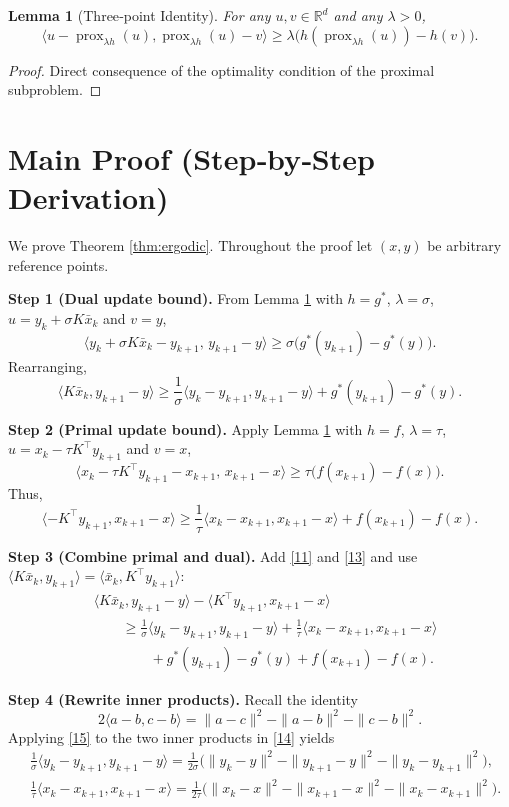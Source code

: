 \documentclass{article}
\newtheorem{lemma}{Lemma}
\newcommand{\prox}{\operatorname{prox}}
\newcommand{\inner}[2]{\langle #1,#2\rangle}
\newcommand{\norm}[1]{\|#1\|}
\begin{document}
\begin{lemma}[Three‑point Identity]\label{lem:three}
For any $u,v\in\mathbb{R}^{d}$ and any $\lambda>0$,
\[
\langle u-\prox_{\lambda h}(u),\prox_{\lambda h}(u)-v\rangle
\ge \lambda\bigl(h(\prox_{\lambda h}(u))-h(v)\bigr).
\tag{9}
\]
\end{lemma}
\begin{proof}
Direct consequence of the optimality condition of the proximal subproblem. \qedhere
\end{proof}

\section*{Main Proof (Step‑by‑Step Derivation)}
We prove Theorem \ref{thm:ergodic}. Throughout the proof let $(x,y)$ be arbitrary reference points.

\medskip
\noindent\textbf{Step 1 (Dual update bound).}  
From Lemma \ref{lem:three} with $h=g^{*}$, $\lambda=\sigma$, $u=y_{k}+\sigma K\bar x_{k}$ and $v=y$,
\[
\langle y_{k}+\sigma K\bar x_{k}-y_{k+1},\,y_{k+1}-y\rangle
\ge \sigma\bigl(g^{*}(y_{k+1})-g^{*}(y)\bigr).
\tag{10}
\]
Rearranging,
\[
\langle K\bar x_{k},y_{k+1}-y\rangle
\ge \frac{1}{\sigma}\langle y_{k}-y_{k+1},y_{k+1}-y\rangle
+g^{*}(y_{k+1})-g^{*}(y).
\tag{11}
\]

\medskip
\noindent\textbf{Step 2 (Primal update bound).}  
Apply Lemma \ref{lem:three} with $h=f$, $\lambda=\tau$, $u=x_{k}-\tau K^{\top}y_{k+1}$ and $v=x$,
\[
\langle x_{k}-\tau K^{\top}y_{k+1}-x_{k+1},\,x_{k+1}-x\rangle
\ge \tau\bigl(f(x_{k+1})-f(x)\bigr).
\tag{12}
\]
Thus,
\[
\langle -K^{\top}y_{k+1},x_{k+1}-x\rangle
\ge \frac{1}{\tau}\langle x_{k}-x_{k+1},x_{k+1}-x\rangle
+f(x_{k+1})-f(x).
\tag{13}
\]

\medskip
\noindent\textbf{Step 3 (Combine primal and dual).}  
Add \eqref{11} and \eqref{13} and use $\inner{K\bar x_{k}}{y_{k+1}}=\inner{\bar x_{k}}{K^{\top}y_{k+1}}$:
\[
\begin{aligned}
&\langle K\bar x_{k},y_{k+1}-y\rangle
-\langle K^{\top}y_{k+1},x_{k+1}-x\rangle\\
&\qquad\ge
\frac{1}{\sigma}\langle y_{k}-y_{k+1},y_{k+1}-y\rangle
+\frac{1}{\tau}\langle x_{k}-x_{k+1},x_{k+1}-x\rangle\\
&\qquad\qquad
+g^{*}(y_{k+1})-g^{*}(y)+f(x_{k+1})-f(x).
\end{aligned}
\tag{14}
\]

\medskip
\noindent\textbf{Step 4 (Rewrite inner products).}  
Recall the identity
\[
2\langle a-b,c-b\rangle=
\norm{a-c}^{2}-\norm{a-b}^{2}-\norm{c-b}^{2}.
\tag{15}
\]
Applying \eqref{15} to the two inner products in \eqref{14} yields
\[
\begin{aligned}
&\frac{1}{\sigma}\langle y_{k}-y_{k+1},y_{k+1}-y\rangle
= \frac{1}{2\sigma}
\bigl(\norm{y_{k}-y}^{2}-\norm{y_{k+1}-y}^{2}-\norm{y_{k}-y_{k+1}}^{2}\bigr),\\[4pt]
&\frac{1}{\tau}\langle x_{k}-x_{k+1},x_{k+1}-x\rangle
= \frac{1}{2\tau}
\bigl(\norm{x_{k}-x}^{2}-\norm{x_{k+1}-x}^{2}-\norm{x_{k}-x_{k+1}}^{2}\bigr).
\end{aligned}
\tag{16}
\]
\end{document}
